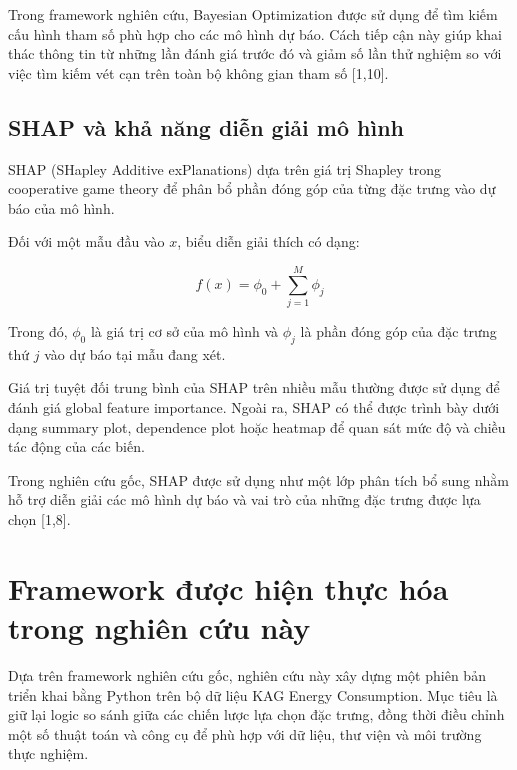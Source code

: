 Trong framework nghiên cứu, Bayesian Optimization được sử dụng
để tìm kiếm cấu hình tham số phù hợp cho các mô hình dự báo.
Cách tiếp cận này giúp khai thác thông tin từ những lần đánh giá
trước đó và giảm số lần thử nghiệm so với việc tìm kiếm vét cạn
trên toàn bộ không gian tham số [1,10].

\subsection{SHAP và khả năng diễn giải mô hình}
\label{subsec:shap-theory}

SHAP (SHapley Additive exPlanations) dựa trên giá trị Shapley
trong cooperative game theory để phân bổ phần đóng góp của từng
đặc trưng vào dự báo của mô hình.

Đối với một mẫu đầu vào $x$, biểu diễn giải thích có dạng:

\begin{equation}
    f(x) = \phi_0 + \sum_{j=1}^{M}\phi_j
    \label{eq:shap-additive-original}
\end{equation}

Trong đó, $\phi_0$ là giá trị cơ sở của mô hình và $\phi_j$
là phần đóng góp của đặc trưng thứ $j$ vào dự báo tại mẫu đang xét.

Giá trị tuyệt đối trung bình của SHAP trên nhiều mẫu thường được
sử dụng để đánh giá global feature importance. Ngoài ra, SHAP
có thể được trình bày dưới dạng summary plot, dependence plot
hoặc heatmap để quan sát mức độ và chiều tác động của các biến.

Trong nghiên cứu gốc, SHAP được sử dụng như một lớp phân tích
bổ sung nhằm hỗ trợ diễn giải các mô hình dự báo và vai trò của
những đặc trưng được lựa chọn [1,8].


\section{Framework được hiện thực hóa trong nghiên cứu này}
\label{sec:implemented-framework}

Dựa trên framework nghiên cứu gốc, nghiên cứu này xây dựng một
phiên bản triển khai bằng Python trên bộ dữ liệu KAG Energy
Consumption. Mục tiêu là giữ lại logic so sánh giữa các chiến
lược lựa chọn đặc trưng, đồng thời điều chỉnh một số thuật toán
và công cụ để phù hợp với dữ liệu, thư viện và môi trường thực
nghiệm.

